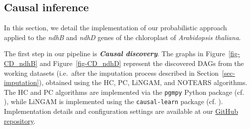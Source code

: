 \documentclass[
]{article}
\theoremstyle{definition}
\theoremstyle{remark}
\begin{document}
\subsection{Causal inference}\label{sec-quantitative-causality}

In this section, we detail the implementation of our probabilistic
approach applied to the \emph{ndhB} and \emph{ndhD} genes of the
chloroplast of \emph{Arabidopsis thaliana}.

The first step in our pipeline is \textbf{\emph{Causal discovery}}. The
graphs in Figure~\ref{fig-CD_ndhB} and Figure~\ref{fig-CD_ndhD}
represent the discovered DAGs from the working datasets (i.e.~after the
imputation process described in Section~\ref{sec-imputation}), obtained
using the HC, PC, LiNGAM, and NOTEARS algorithms. The HC and PC
algorithms are implemented via the \texttt{pgmpy} Python package (cf.
), while LiNGAM is implemented
using the \texttt{causal-learn} package (cf.
). Implementation details and
configuration settings are available at our
\href{https://github.com/cambroise/chloroDAG}{GitHub repository}.
\end{document}
